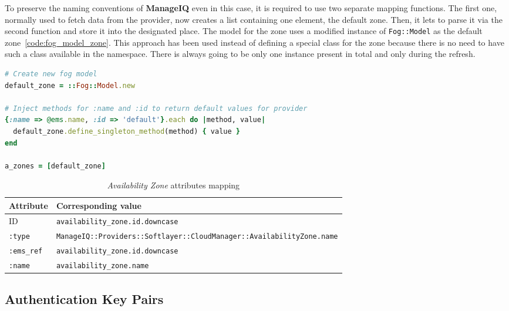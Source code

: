 To preserve the naming conventions of \textbf{ManageIQ} even in this case, it is required to use two separate mapping functions. The first one, normally used to fetch data from the provider, now creates a list containing one element, the default zone. Then, it lets to parse it via the second function and store it into the designated place. The model for the zone uses a modified instance of \verb|Fog::Model| as the default zone~\ref{code:fog_model_zone}. This approach has been used instead of defining a special class for the zone because there is no need to have such a class available in the namespace. There is always going to be only one instance present in total and only during the refresh.

\begin{lstlisting}[language=Ruby,caption={Declaration of the default \emph{Availability Zone}},label=code:fog_model_zone,float=htpb]
# Create new fog model
default_zone = ::Fog::Model.new

# Inject methods for :name and :id to return default values for provider
{:name => @ems.name, :id => 'default'}.each do |method, value|
  default_zone.define_singleton_method(method) { value }
end

a_zones = [default_zone]
\end{lstlisting}

\begin{table}[ht]
	\centering
	\caption{\emph{Availability Zone} attributes mapping}\label{tab:Availability Zone attributes mapping}
	\begin{tabular}{ll}
		\toprule
		Attribute       & Corresponding value                                                              \\
		\midrule
		ID              & \verb|availability_zone.id.downcase|                                             \\
		\verb|:type|    & \small\verb|ManageIQ::Providers::Softlayer::CloudManager::AvailabilityZone.name| \\
		\verb|:ems_ref| & \verb|availability_zone.id.downcase|                                             \\
		\verb|:name|    & \verb|availability_zone.name|                                                    \\
		\bottomrule
	\end{tabular}
\end{table}

\subsection{Authentication Key Pairs}
\label{sub:Authentication Key Pairs}

